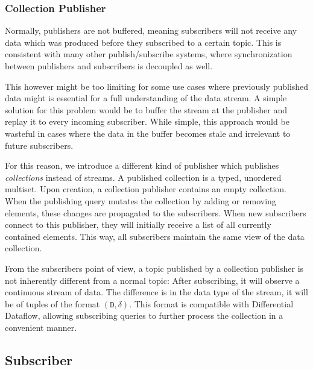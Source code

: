 
\subsubsection{Collection Publisher}

Normally, publishers are not buffered, meaning subscribers will
not receive any data which was produced before they subscribed to a certain
topic. This is consistent with many other publish/subscribe systems, where
synchronization between publishers and subscribers is decoupled as well. \cite{pubsub}

This however might be too limiting for some use cases where previously published
data might is essential for a full understanding of the data stream. A simple
solution for this problem would be to buffer the stream at the publisher
and replay it to every incoming subscriber. While simple, this approach
would be wasteful in cases where the data in the buffer becomes stale and
irrelevant to future subscribers. 

For this reason, we introduce a different kind of publisher which publishes
\emph{collections} instead of streams. A published collection is a typed, unordered
multiset. Upon creation, a collection publisher contains an empty collection.
When the publishing query mutates the collection by adding or removing elements,
these changes are propagated to the subscribers. When new subscribers connect
to this publisher, they will initially receive a list of all currently contained
elements. This way, all subscribers maintain the same view of the data collection.

From the subscribers point of view, a topic published by a collection publisher
is not inherently different from a normal topic: After subscribing, it will
observe a continuous stream of data. The difference is in the data type of the
stream, it will be of tuples of the format $(\texttt{D}, \delta)$. This format
is compatible with Differential Dataflow, allowing subscribing queries to
further process the collection in a convenient manner.


\subsection{Subscriber}

